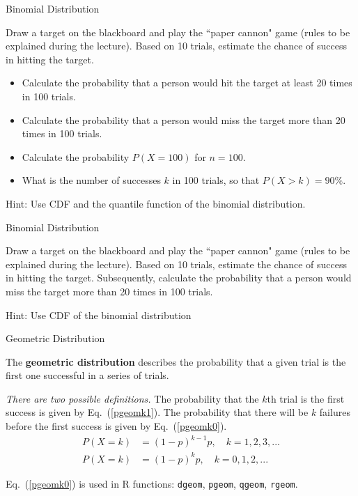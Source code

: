 \begin{frame}{Binomial Distribution}

    \begin{example}
        \medskip
        Draw a target on the blackboard and play the ``paper cannon" game (rules to be explained during the lecture). Based on 10 trials, estimate the chance of success in hitting the target. \begin{itemize}
            \item Calculate the probability that a person would hit the target at least 20 times in 100 trials.
            \item Calculate the probability that a person would miss the target more than 20 times in 100 trials.
            \item Calculate the probability $P(X = 100)$ for $n = 100$.
            \item What is the number of successes $k$ in 100 trials, so that $P(X > k) = 90\%$.
        \end{itemize} 
        
        {\tiny Hint: Use CDF and the quantile function of the binomial distribution.}
    \end{example}

\end{frame}

\begin{frame}{Binomial Distribution}
\begin{example}
    \medskip
    Draw a target on the blackboard and play the ``paper cannon" game (rules to be explained during the lecture). Based on 10 trials, estimate the chance of success in hitting the target. Subsequently, calculate the probability that a person would miss the target more than 20 times in 100 trials.
    
    {\tiny Hint: Use CDF of the binomial distribution}
\end{example}
\end{frame}

\begin{frame}{Geometric Distribution}

    The \textbf{geometric distribution} describes the probability that a given trial is the first one successful in a series of trials.
    
    \emph{There are two possible definitions.} The probability that the $k$th trial is the first success is given by Eq.~(\ref{pgeomk1}). The probability that there will be $k$ failures before the first success is given by Eq.~(\ref{pgeomk0}).
    \begin{align}
    P(X=k) &= (1-p)^{k-1} p,\quad k=1, 2, 3, ...\label{pgeomk1}\\
    P(X=k) &= (1-p)^k p,\quad k=0, 1, 2, ...\label{pgeomk0}
    \end{align}
    
    Eq.~(\ref{pgeomk0}) is used in R functions: {\small \texttt{dgeom}, \texttt{pgeom}, \texttt{qgeom}, \texttt{rgeom}}.
\end{frame}

